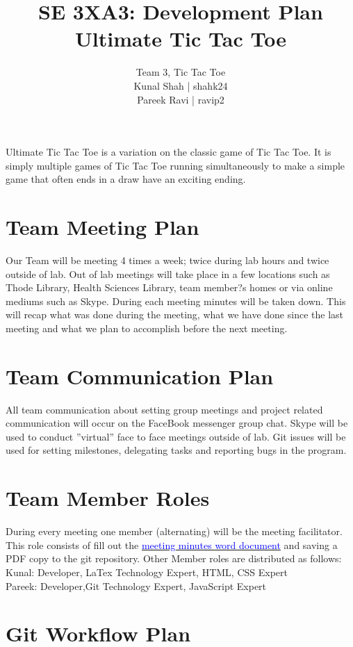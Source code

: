 \documentclass{article}
\title{SE 3XA3: Development Plan\\Ultimate Tic Tac Toe}
\author{Team 3, Tic Tac Toe
		\\ Kunal Shah | shahk24
		\\ Pareek Ravi | ravip2
}
\date{}
\begin{document}
\maketitle

Ultimate Tic Tac Toe is a variation on the classic game of Tic Tac Toe. It is 
simply multiple games of Tic Tac Toe running simultaneously to make a simple 
game that often ends in a draw have an exciting ending.

\section{Team Meeting Plan}
Our Team will be meeting 4 times a week; twice during lab hours and twice 
outside of lab. Out of lab meetings will take place in a few locations such as
Thode Library, Health Sciences Library, team member?s homes or via online 
 mediums such as Skype. During each meeting minutes will be taken down. 
 This will recap what was done during the meeting, what we have done since the 
last meeting and what we plan to accomplish before the next meeting. \\

\section{Team Communication Plan}
All team communication about setting group meetings and project related 
communication will occur on the FaceBook messenger group chat. Skype will be 
used to conduct ''virtual'' face to face meetings outside of lab. Git issues 
will be used for setting milestones, delegating tasks and reporting bugs in the 
program. \\

\section{Team Member Roles}
During every meeting one member (alternating) will be the meeting facilitator. 
This role consists of fill out the \href{run:3XA3 Meeting Summary Template.docx}{\textcolor{blue}{meeting minutes word document}} 
and saving a PDF copy to the git repository. Other Member roles are distributed as follows:\\
Kunal: Developer, LaTex Technology Expert, HTML, CSS Expert \\
Pareek: Developer,Git Technology Expert, JavaScript Expert \\

\section{Git Workflow Plan}
\end{document}
